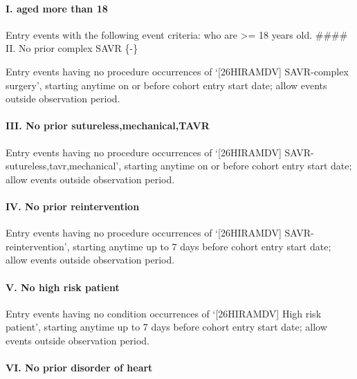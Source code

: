 \documentclass[
  12pt,
]{article}
\begin{document}
\paragraph*{I. aged more than 18}\label{i.-aged-more-than-18-1}

Entry events with the following event criteria: who are \textgreater= 18
years old. \#\#\#\# II. No prior complex SAVR \{-\}

Entry events having no procedure occurrences of `{[}26HIRAMDV{]}
SAVR-complex surgery', starting anytime on or before cohort entry start
date; allow events outside observation period.

\paragraph*{III. No prior
sutureless,mechanical,TAVR}\label{iii.-no-prior-suturelessmechanicaltavr-1}

Entry events having no procedure occurrences of `{[}26HIRAMDV{]}
SAVR-sutureless,tavr,mechanical', starting anytime on or before cohort
entry start date; allow events outside observation period.

\paragraph*{IV. No prior
reintervention}\label{iv.-no-prior-reintervention-1}

Entry events having no procedure occurrences of `{[}26HIRAMDV{]}
SAVR-reintervention', starting anytime up to 7 days before cohort entry
start date; allow events outside observation period.

\paragraph*{V. No high risk patient}\label{v.-no-high-risk-patient-1}

Entry events having no condition occurrences of `{[}26HIRAMDV{]} High
risk patient', starting anytime up to 7 days before cohort entry start
date; allow events outside observation period.

\paragraph*{VI. No prior disorder of
heart}\label{vi.-no-prior-disorder-of-heart-1}
\end{document}
